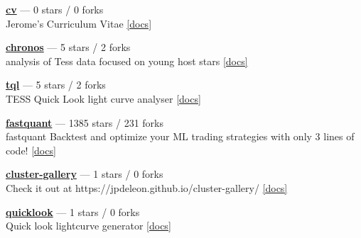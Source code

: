 \item \href{https://github.com/jpdeleon/cv}{{\bf cv}} --- 0 stars / 0 forks \\
Jerome's Curriculum Vitae \href{https://raw.githubusercontent.com/jpdeleon/cv/main-pdf/tex/cv_pubs.pdf}{[docs]}

\item \href{https://github.com/jpdeleon/chronos}{{\bf chronos}} --- 5 stars / 2 forks \\
analysis of Tess data focused on young host stars \href{None}{[docs]}

\item \href{https://github.com/jpdeleon/tql}{{\bf tql}} --- 5 stars / 2 forks \\
TESS Quick Look light curve analyser \href{None}{[docs]}

\item \href{https://github.com/enzoampil/fastquant}{{\bf fastquant}} --- 1385 stars / 231 forks \\
fastquant {\textemdash} Backtest and optimize your ML trading strategies with only 3 lines of code! \href{}{[docs]}

\item \href{https://github.com/jpdeleon/cluster-gallery}{{\bf cluster-gallery}} --- 1 stars / 0 forks \\
Check it out at https://jpdeleon.github.io/cluster-gallery/ \href{None}{[docs]}

\item \href{https://github.com/jpdeleon/quicklook}{{\bf quicklook}} --- 1 stars / 0 forks \\
Quick look lightcurve generator \href{None}{[docs]}
